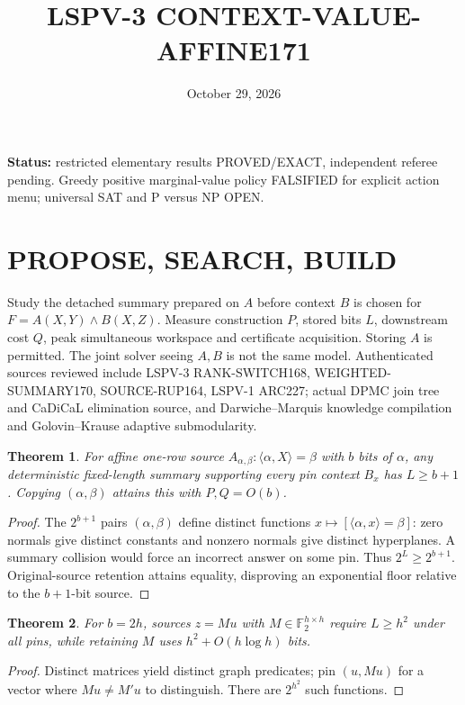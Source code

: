 \documentclass{article}
\title{LSPV-3 CONTEXT-VALUE-AFFINE171}
\date{October 29, 2026}
\newtheorem{theorem}{Theorem}
\begin{document}
\maketitle
\noindent\textbf{Status:} restricted elementary results PROVED/EXACT, independent referee pending. Greedy positive marginal-value policy FALSIFIED for explicit action menu; universal SAT and P versus NP OPEN.
\section{PROPOSE, SEARCH, BUILD}
Study the detached summary prepared on $A$ before context $B$ is chosen for $F=A(X,Y)\land B(X,Z)$. Measure construction $P$, stored bits $L$, downstream cost $Q$, peak simultaneous workspace and certificate acquisition. Storing $A$ is permitted. The joint solver seeing $A,B$ is not the same model. Authenticated sources reviewed include LSPV-3 RANK-SWITCH168, WEIGHTED-SUMMARY170, SOURCE-RUP164, LSPV-1 ARC227; actual DPMC join tree and CaDiCaL elimination source, and Darwiche--Marquis knowledge compilation and Golovin--Krause adaptive submodularity.
\begin{theorem}
For affine one-row source $A_{\alpha,\beta}: \langle\alpha,X\rangle=\beta$ with $b$ bits of $\alpha$, any deterministic fixed-length summary supporting every pin context $B_x$ has $L\ge b+1$. Copying $(\alpha,\beta)$ attains this with $P,Q=O(b)$.
\end{theorem}
\begin{proof}
The $2^{b+1}$ pairs $(\alpha,\beta)$ define distinct functions $x\mapsto[\langle\alpha,x\rangle=\beta]$: zero normals give distinct constants and nonzero normals give distinct hyperplanes. A summary collision would force an incorrect answer on some pin. Thus $2^L\ge2^{b+1}$. Original-source retention attains equality, disproving an exponential floor relative to the $b+1$-bit source.
\end{proof}
\begin{theorem}
For $b=2h$, sources $z=Mu$ with $M\in\mathbb F_2^{h\times h}$ require $L\ge h^2$ under all pins, while retaining $M$ uses $h^2+O(h\log h)$ bits.
\end{theorem}
\begin{proof}
Distinct matrices yield distinct graph predicates; pin $(u,Mu)$ for a vector where $Mu\ne M'u$ to distinguish. There are $2^{h^2}$ such functions.
\end{proof}
\end{document}
